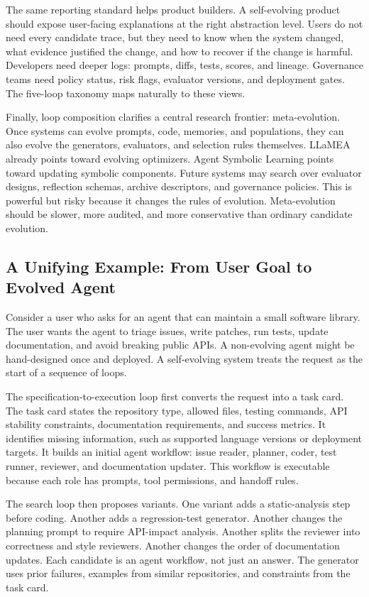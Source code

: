 The same reporting standard helps product builders.  A self-evolving product should expose user-facing explanations at the right abstraction level.  Users do not need every candidate trace, but they need to know when the system changed, what evidence justified the change, and how to recover if the change is harmful.  Developers need deeper logs: prompts, diffs, tests, scores, and lineage.  Governance teams need policy status, risk flags, evaluator versions, and deployment gates.  The five-loop taxonomy maps naturally to these views.

Finally, loop composition clarifies a central research frontier: meta-evolution.  Once systems can evolve prompts, code, memories, and populations, they can also evolve the generators, evaluators, and selection rules themselves.  LLaMEA already points toward evolving optimizers.  Agent Symbolic Learning points toward updating symbolic components.  Future systems may search over evaluator designs, reflection schemas, archive descriptors, and governance policies.  This is powerful but risky because it changes the rules of evolution.  Meta-evolution should be slower, more audited, and more conservative than ordinary candidate evolution.

\subsection{A Unifying Example: From User Goal to Evolved Agent}
\label{subsec:taxonomy-unifying-example}

Consider a user who asks for an agent that can maintain a small software library.  The user wants the agent to triage issues, write patches, run tests, update documentation, and avoid breaking public APIs.  A non-evolving agent might be hand-designed once and deployed.  A self-evolving system treats the request as the start of a sequence of loops.

The specification-to-execution loop first converts the request into a task card.  The task card states the repository type, allowed files, testing commands, API stability constraints, documentation requirements, and success metrics.  It identifies missing information, such as supported language versions or deployment targets.  It builds an initial agent workflow: issue reader, planner, coder, test runner, reviewer, and documentation updater.  This workflow is executable because each role has prompts, tool permissions, and handoff rules.

The search loop then proposes variants.  One variant adds a static-analysis step before coding.  Another adds a regression-test generator.  Another changes the planning prompt to require API-impact analysis.  Another splits the reviewer into correctness and style reviewers.  Another changes the order of documentation updates.  Each candidate is an agent workflow, not just an answer.  The generator uses prior failures, examples from similar repositories, and constraints from the task card.


